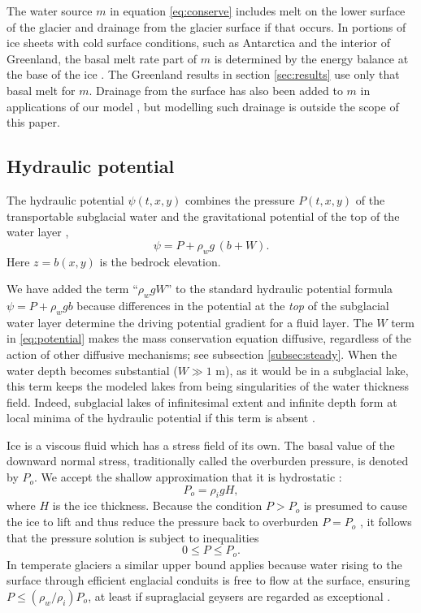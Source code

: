 \documentclass[gmd]{copernicus}   %
\begin{document}
The water source $m$ in equation \eqref{eq:conserve} includes melt on the lower surface of the glacier and drainage from the glacier surface if that occurs.  In portions of ice sheets with cold surface conditions, such as Antarctica and the interior of Greenland, the basal melt rate part of $m$ is determined by the energy balance at the base of the ice \citep{AschwandenBuelerKhroulevBlatter}.  The Greenland results in section \ref{sec:results} use only that basal melt for $m$.  Drainage from the surface has also been added to $m$ in applications of our model \citep{vanPeltthesis}, but modelling such drainage is outside the scope of this paper.

\subsection{Hydraulic potential}  The  hydraulic potential $\psi(t,x,y)$ combines the pressure $P(t,x,y)$ of the transportable subglacial water and the gravitational potential of the top of the water layer \citep{Goelleretal2013,Hewittetal2012},
\begin{equation} \label{eq:potential}
\psi = P + \rho_w g\, (b+W).
\end{equation}
Here $z=b(x,y)$ is the bedrock elevation.

We have added the term ``$\rho_w g W$'' to the standard hydraulic potential formula $\psi = P + \rho_w g b$ \citep{Clarke05,Shreve1972} because differences in the potential at the \emph{top} of the subglacial water layer determine the driving potential gradient for a fluid layer.  The $W$ term in \eqref{eq:potential} makes the mass conservation equation diffusive, regardless of the action of other diffusive mechanisms; see subsection \ref{subsec:steady}.  When the water depth becomes substantial ($W\gg 1$ m), as it would be in a subglacial lake, this term keeps the modeled lakes from being singularities of the water thickness field.  Indeed, subglacial lakes of infinitesimal extent and infinite depth form at local minima of the hydraulic potential if this term is absent \citep{LeBrocqetal2009}.

Ice is a viscous fluid which has a stress field of its own.  The basal value of the downward normal stress, traditionally called the overburden pressure, is denoted by $P_o$.  We accept the shallow approximation that it is hydrostatic \citep{GreveBlatter2009}:
\begin{equation} \label{eq:hydrostatic}
  P_o = \rho_i g H,
\end{equation}
where $H$ is the ice thickness.  Because the condition $P>P_o$ is presumed to cause the ice to lift and thus reduce the pressure back to overburden $P=P_o$ \citep{Schoofetal2012}, it follows that the pressure solution is subject to inequalities
\begin{equation}
0 \le P \le P_o. \label{eq:bounds}
\end{equation}
In temperate glaciers a similar upper bound applies because water rising to the surface through efficient englacial conduits is free to flow at the surface, ensuring $P\le (\rho_w/\rho_i) P_o$, at least if supraglacial geysers are regarded as exceptional \citep{Bartholomausetal2011,Bueler2014correspondence}.
\end{document}
